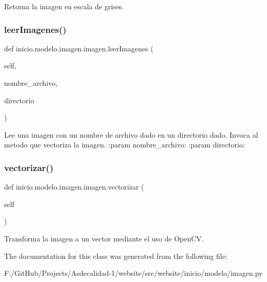 \begin{DoxyVerb}Retorna la imagen en escala de grises. 
\end{DoxyVerb}
 \mbox{\label{classinicio_1_1modelo_1_1imagen_1_1imagen_a26354b229b4443a5ff61891bc5a617fa}} 
\subsubsection{\texorpdfstring{leer\+Imagenes()}{leerImagenes()}}
{\footnotesize\ttfamily def inicio.\+modelo.\+imagen.\+imagen.\+leer\+Imagenes (\begin{DoxyParamCaption}\item[{}]{self,  }\item[{}]{nombre\+\_\+archivo,  }\item[{}]{directorio }\end{DoxyParamCaption})}

\begin{DoxyVerb}Lee una imagen con un nombre de archivo dado en un directorio dado.
Invoca al metodo que vectoriza la imagen.
:param nombre_archivo:
:param directorio:
\end{DoxyVerb}
 \mbox{\label{classinicio_1_1modelo_1_1imagen_1_1imagen_a2cc040551f968a5c0f3a511ceda73804}} 
\subsubsection{\texorpdfstring{vectorizar()}{vectorizar()}}
{\footnotesize\ttfamily def inicio.\+modelo.\+imagen.\+imagen.\+vectorizar (\begin{DoxyParamCaption}\item[{}]{self }\end{DoxyParamCaption})}

\begin{DoxyVerb}Transforma la imagen a un vector mediante el uso de OpenCV.
\end{DoxyVerb}
 

The documentation for this class was generated from the following file\+:\begin{DoxyCompactItemize}
\item 
F\+:/\+Git\+Hub/\+Projects/\+Asdecalidad-\/1/website/src/website/inicio/modelo/imagen.\+py\end{DoxyCompactItemize}
